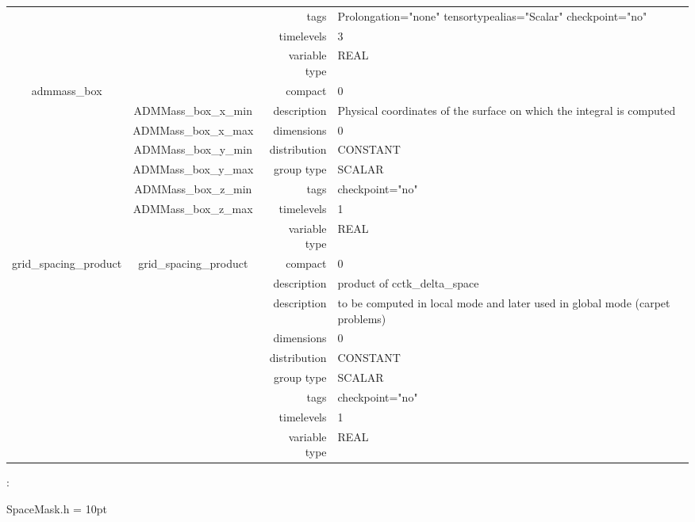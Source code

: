 \begin{tabular*}{150mm}{|c|c@{\extracolsep{\fill}}|rl|}
 &  & tags & Prolongation="none" tensortypealias="Scalar" checkpoint="no" \\ 
 &  & timelevels & 3 \\ 
 &  & variable type & REAL \\ 
\hline 
admmass\_box &  & compact & 0 \\ 
 & ADMMass\_box\_x\_min & description & Physical coordinates of the surface on which the integral is computed \\ 
 & ADMMass\_box\_x\_max & dimensions & 0 \\ 
 & ADMMass\_box\_y\_min & distribution & CONSTANT \\ 
 & ADMMass\_box\_y\_max & group type & SCALAR \\ 
 & ADMMass\_box\_z\_min & tags & checkpoint="no" \\ 
 & ADMMass\_box\_z\_max & timelevels & 1 \\ 
 &  & variable type & REAL \\ 
\hline 
grid\_spacing\_product & grid\_spacing\_product & compact & 0 \\ 
 &  & description & product of cctk\_delta\_space \\ 
& ~ & description &  to be computed in local mode and later used in global mode (carpet problems) \\ 
 &  & dimensions & 0 \\ 
 &  & distribution & CONSTANT \\ 
 &  & group type & SCALAR \\ 
 &  & tags & checkpoint="no" \\ 
 &  & timelevels & 1 \\ 
 &  & variable type & REAL \\ 
\hline 
\end{tabular*} 



\vspace{5mm}

: 

SpaceMask.h
\vspace{2mm}\parskip = 10pt 
